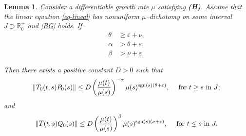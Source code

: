 \documentclass[9pt]{amsart}
\newtheorem{lemma}{Lemma}
\numberwithin{equation}{section}
\numberwithin{lemma}{section}
\begin{document}
\begin{lemma}
    Consider a differentiable growth rate $\mu$ satisfying \textbf{\textbf{(H)}}. Assume that the linear equation \eqref{eq-lineal} has nonuniform $\mu$--dichotomy on some interval $J\supset \mathbb{R}_0^{+}$ and \eqref{BG} holds. If  \begin{subequations}\label{hyp:mu-dichotomy}
\begin{align}
\theta &\geq \varepsilon + \nu, \label{hyp:mu-dichotomy-theta} \\
\alpha &> \theta + \varepsilon, \label{hyp:mu-dichotomy-alpha} \\
\beta  &> \nu + \varepsilon. \label{hyp:mu-dichotomy-beta}
\end{align}
\end{subequations}

Then there exists a positive constant $D>0$ such that 
    \begin{equation}\label{B1}
        \|T_0(t,s)P_0(s)\|\leq D\left(\frac{\mu(t)}{\mu(s)}\right)^{-\alpha}\mu(s)^{\textnormal{sgn}(s)(\theta+\varepsilon)} , \quad \textnormal{ for } t\geq s \textnormal{ in } J;
    \end{equation}
    and
    \begin{equation}\label{B2}
         \|\overline{T}(t,s)Q_0(s)\|\leq D\left(\frac{\mu(t)}{\mu(s)}\right)^{\beta}\mu(s)^{\textnormal{sgn}(s)(\nu+\varepsilon)} , \quad \textnormal{ for } t\leq s \textnormal{ in } J.
    \end{equation}
\end{lemma}
\end{document}
